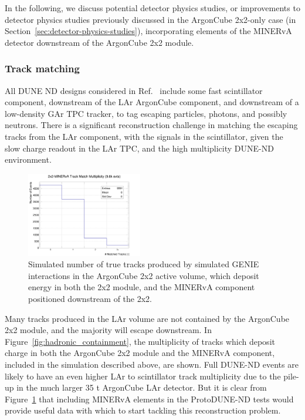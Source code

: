 In the following, we discuss potential detector physics studies, or improvements to detector physics studies previously discussed in the ArgonCube 2x2-only case (in Section~\ref{sec:detector-physics-studies}), incorporating elements of the MINERvA detector downstream of the ArgonCube 2x2 module.

\subsubsection{Track matching}
All DUNE ND designs considered in Ref.~\cite{dune_ndcsg} include some fast scintillator component, downstream of the LAr ArgonCube component, and downstream of a low-density GAr TPC tracker, to tag escaping particles, photons, and possibly neutrons. There is a significant reconstruction challenge in matching the escaping tracks from the LAr component, with the signals in the scintillator, given the slow charge readout in the LAr TPC, and the high multiplicity DUNE-ND environment.

\begin{figure}[htb]
  \centering
  \includegraphics[width=0.45\textwidth]{plots/2x2_minerva_plots/track_mathch_multiplicity.png}
  \caption{Simulated number of true tracks produced by simulated GENIE interactions in the ArgonCube 2x2 active volume, which deposit energy in both the 2x2 module, and the MINERvA component positioned downstream of the 2x2.}
  \label{fig:track_multiplicity}
\end{figure}
Many tracks produced in the LAr volume are not contained by the ArgonCube 2x2 module, and the majority will escape downstream. In Figure~\ref{fig:hadronic_containment}, the multiplicity of tracks which deposit charge in both the ArgonCube 2x2 module and the MINERvA component, included in the simulation described above, are shown. Full DUNE-ND events are likely to have an even higher LAr to scintillator track multiplicity due to the pile-up in the much larger 35 t ArgonCube LAr detector. But it is clear from Figure~\ref{fig:track_multiplicity} that including MINERvA elements in the ProtoDUNE-ND tests would provide useful data with which to start tackling this reconstruction problem.

